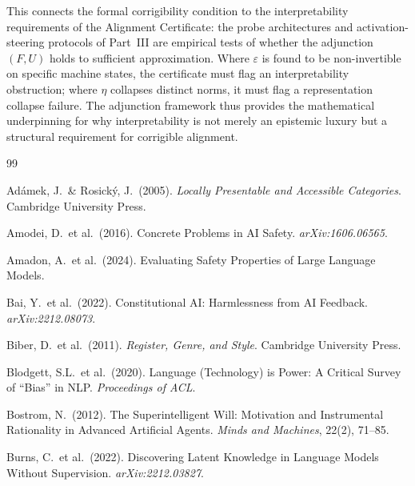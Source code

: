 \documentclass[12pt]{article}
\theoremstyle{definition}
\begin{document}
This connects the formal corrigibility condition to the interpretability
requirements of the Alignment Certificate: the probe architectures and
activation-steering protocols of Part~III are empirical tests of whether the
adjunction $(F, U)$ holds to sufficient approximation. Where $\varepsilon$ is
found to be non-invertible on specific machine states, the certificate must
flag an interpretability obstruction; where $\eta$ collapses distinct norms,
it must flag a representation collapse failure. The adjunction framework thus
provides the mathematical underpinning for why interpretability is not merely
an epistemic luxury but a structural requirement for corrigible alignment.


\begin{thebibliography}{99}

Ad\'{a}mek, J.\ \& Rosick\'{y}, J.\ (2005).
\newblock \emph{Locally Presentable and Accessible Categories}.
\newblock Cambridge University Press.

Amodei, D.\ et al.\ (2016).
\newblock Concrete Problems in AI Safety.
\newblock \emph{arXiv:1606.06565}.

Amadon, A.\ et al.\ (2024).
\newblock Evaluating Safety Properties of Large Language Models.

Bai, Y.\ et al.\ (2022).
\newblock Constitutional AI: Harmlessness from AI Feedback.
\newblock \emph{arXiv:2212.08073}.

Biber, D.\ et al.\ (2011).
\newblock \emph{Register, Genre, and Style}.
\newblock Cambridge University Press.

Blodgett, S.L.\ et al.\ (2020).
\newblock Language (Technology) is Power: A Critical Survey of ``Bias'' in NLP.
\newblock \emph{Proceedings of ACL}.

Bostrom, N.\ (2012).
\newblock The Superintelligent Will: Motivation and Instrumental Rationality in
Advanced Artificial Agents.
\newblock \emph{Minds and Machines}, 22(2), 71--85.

Burns, C.\ et al.\ (2022).
\newblock Discovering Latent Knowledge in Language Models Without Supervision.
\newblock \emph{arXiv:2212.03827}.


\end{thebibliography}
\end{document}
